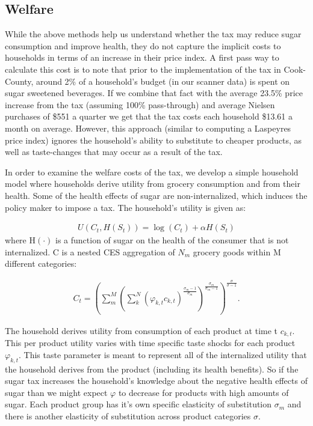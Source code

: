 \documentclass[12pt]{article}
\begin{document}
\subsection{Welfare}

While the above methods help us understand whether the tax may reduce sugar consumption and improve health, they do not capture the implicit costs to households in terms of an increase in their price index. A first pass way to calculate this cost is to note that prior to the implementation of the tax in Cook-County, around 2\% of a household's budget (in our scanner data) is spent on sugar sweetened beverages. If we combine that fact with the average 23.5\% price increase from the tax (assuming 100\% pass-through) and average Nielsen purchases of \$551 a quarter we get that the tax costs each household \$13.61 a month on average. However, this approach (similar to computing a Laspeyres price index) ignores the household's ability to substitute to cheaper products, as well as taste-changes that may occur as a result of the tax.


In order to examine the welfare costs of the tax, we develop a simple household model where households derive utility from grocery consumption and from their health. Some of the health effects of sugar are non-internalized, which induces the policy maker to impose a tax. The household's utility is given as:

\begin{align}
	U(C_t,H(S_t)) = \log(C_t) + \alpha H(S_t)
\end{align}
where H$(\cdot)$ is a function of sugar on the health of the consumer that is not internalized. C is a nested CES aggregation of $N_m$ grocery goods within M different categories:

\begin{align}
	C_t = \left( \sum_m^M \left( \sum_k^N (\varphi_{k,t} c_{k,t})^{\frac{\sigma_m-1}{\sigma_m}}  \right)^{\frac{\sigma_m}{\sigma_m-1}} \right)^{\frac{\sigma}{\sigma-1}}.
\end{align}

The household derives utility from consumption of each product at time t $c_{k,t}$. This per product utility varies with time specific taste shocks for each product $\varphi_{k,t}$. This taste parameter is meant to represent all of the internalized utility that the household derives from the product (including its health benefits). So if the sugar tax increases the household's knowledge about the negative health effects of sugar than we might expect $\varphi$ to decrease for products with high amounts of sugar. Each product group has it's own specific elasticity of substitution $\sigma_m$ and there is another elasticity of substitution across product categories $\sigma$.
\end{document}
